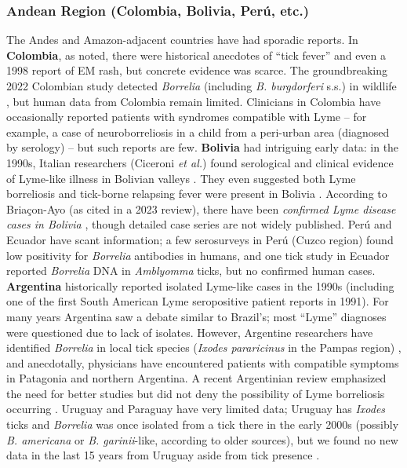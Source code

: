 \documentclass[11pt,letterpaper]{article}
\begin{document}
\subsubsection{Andean Region (Colombia, Bolivia, Perú, etc.)}
The Andes and Amazon-adjacent countries have had sporadic reports. In \textbf{Colombia}, as noted, there were historical anecdotes of “tick fever” and even a 1998 report of EM rash, but concrete evidence was scarce. The groundbreaking 2022 Colombian study detected \textit{Borrelia} (including \textit{B. burgdorferi} s.s.) in wildlife \citep{Mancilla-Agrono2022c}, but human data from Colombia remain limited. Clinicians in Colombia have occasionally reported patients with syndromes compatible with Lyme – for example, a case of neuroborreliosis in a child from a peri-urban area (diagnosed by serology) – but such reports are few. \textbf{Bolivia} had intriguing early data: in the 1990s, Italian researchers (Ciceroni \textit{et al.}) found serological and clinical evidence of Lyme-like illness in Bolivian valleys \citep{Lucca2024p}. They even suggested both Lyme borreliosis and tick-borne relapsing fever were present in Bolivia \citep{Lucca2024q}. According to Briaçon-Ayo (as cited in a 2023 review), there have been \textit{confirmed Lyme disease cases in Bolivia} \citep{Lucca2024r}, though detailed case series are not widely published. Perú and Ecuador have scant information; a few serosurveys in Perú (Cuzco region) found low positivity for \textit{Borrelia} antibodies in humans, and one tick study in Ecuador reported \textit{Borrelia} DNA in \textit{Amblyomma} ticks, but no confirmed human cases. \textbf{Argentina} historically reported isolated Lyme-like cases in the 1990s (including one of the first South American Lyme seropositive patient reports in 1991). For many years Argentina saw a debate similar to Brazil’s; most “Lyme” diagnoses were questioned due to lack of isolates. However, Argentine researchers have identified \textit{Borrelia} in local tick species (\textit{Ixodes pararicinus} in the Pampas region) \citep{Lucca2024s}, and anecdotally, physicians have encountered patients with compatible symptoms in Patagonia and northern Argentina. A recent Argentinian review emphasized the need for better studies but did not deny the possibility of Lyme borreliosis occurring \citep{Lucca2024t}. Uruguay and Paraguay have very limited data; Uruguay has \textit{Ixodes} ticks and \textit{Borrelia} was once isolated from a tick there in the early 2000s (possibly \textit{B. americana} or \textit{B. garinii}-like, according to older sources), but we found no new data in the last 15 years from Uruguay aside from tick presence \citep{Lucca2024u}.
\end{document}
